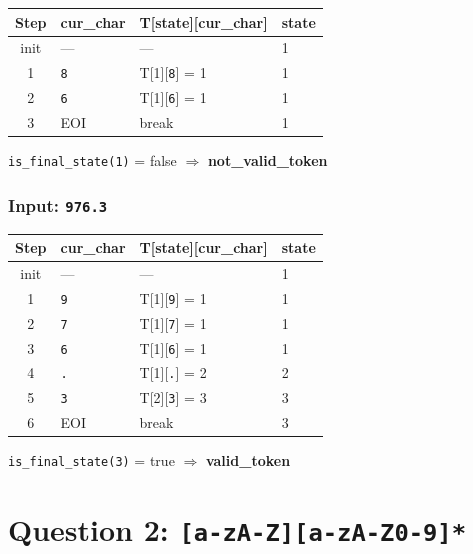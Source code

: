 \documentclass[a4paper,12pt]{article}
\begin{document}
\begin{center}
\renewcommand{\arraystretch}{1.2}
\begin{tabular}{c|l|l|l}
\toprule
\textbf{Step} & \textbf{cur\_char} & \textbf{T[state][cur\_char]} & \textbf{state} \\
\midrule
init  & ---           & ---              & 1 \\
1     & \texttt{8}    & T[1][\texttt{8}] = 1     & 1 \\
2     & \texttt{6}    & T[1][\texttt{6}] = 1     & 1 \\
3     & EOI           & break            & 1 \\
\bottomrule
\end{tabular}
\end{center}
\texttt{is\_final\_state(1)} = false $\Rightarrow$ \textbf{not\_valid\_token}

\subsubsection*{Input: \texttt{976.3}}

\begin{center}
\renewcommand{\arraystretch}{1.2}
\begin{tabular}{c|l|l|l}
\toprule
\textbf{Step} & \textbf{cur\_char} & \textbf{T[state][cur\_char]} & \textbf{state} \\
\midrule
init  & ---           & ---              & 1 \\
1     & \texttt{9}    & T[1][\texttt{9}] = 1     & 1 \\
2     & \texttt{7}    & T[1][\texttt{7}] = 1     & 1 \\
3     & \texttt{6}    & T[1][\texttt{6}] = 1     & 1 \\
4     & \texttt{.}    & T[1][\texttt{.}] = 2     & 2 \\
5     & \texttt{3}    & T[2][\texttt{3}] = 3     & 3 \\
6     & EOI           & break            & 3 \\
\bottomrule
\end{tabular}
\end{center}
\texttt{is\_final\_state(3)} = true $\Rightarrow$ \textbf{valid\_token}

\newpage
\section{Question 2: \texttt{[a-zA-Z][a-zA-Z0-9]*}}
\end{document}

